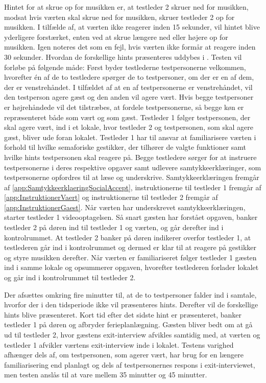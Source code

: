 Hintet for at skrue op for musikken er, at testleder 2 skruer ned for musikken, modsat hvis værten skal skrue ned for musikken, skruer testleder 2 op for musikken. I tilfælde af, at værten ikke reagerer inden 15 sekunder, vil hintet blive yderligere forstærket, enten ved at skrue længere ned eller højere op for musikken. Igen noteres det som en fejl, hvis værten ikke formår at reagere inden 30 sekunder. Hvordan de forskellige hints præsenteres uddybes i .\blankline
% 
Testen vil forløbe på følgende måde: Først byder testlederne testpersonerne velkommen, hvorefter én af de to testledere spørger de to testpersoner, om der er en af dem, der er venstrehåndet. I tilfældet af at en af testpersonerne er venstrehåndet, vil den testperson agere gæst og den anden vil agere vært. Hvis begge testpersoner er højrehåndede vil det tilstræbes, at fordele testpersonerne, så begge køn er repræsenteret både som vært og som gæst. Testleder 1 følger testpersonen, der skal agere vært, ind i et lokale, hvor testleder 2 og testpersonen, som skal agere gæst, bliver ude foran lokalet. Testleder 1 har til ansvar at familiarisere værten i forhold til hvilke semaforiske gestikker, der tilhører de valgte funktioner samt hvilke hints testpersonen skal reagere på. Begge testledere sørger for at instruere testpersonerne i deres respektive opgaver samt udlevere samtykkeerklæringer, som testpersonerne opfordres til at læse og underskrive. Samtykkeerklæringen fremgår af \autoref{app:SamtykkeerklaeringSocialAccept}, instruktionerne til testleder 1 fremgår af \autoref{app:InstruktionerVaert} og instruktionerne til testleder 2 fremgår af \autoref{app:InstruktionerGaest}. Når værten har underskrevet samtykkeerklæringen, starter testleder 1 videooptagelsen. Så snart gæsten har forstået opgaven, banker testleder 2 på døren ind til testleder 1 og værten, og går derefter ind i kontrolrummet. At testleder 2 banker på døren indikerer overfor testleder 1, at testlederen går ind i kontrolrummet og dermed er klar til at reagere på gestikker og styre musikken derefter. Når værten er familiariseret følger testleder 1 gæsten ind i samme lokale og opsummerer opgaven, hvorefter testlederen forlader lokalet og går ind i kontrolrummet til testleder 2.
 
Der afsættes omkring fire minutter til, at de to testpersoner falder ind i samtale, hvorfor der i den tidsperiode ikke vil præsenteres hints. Derefter vil de forskellige hints blive præsenteret. Kort tid efter det sidste hint er præsenteret, banker testleder 1 på døren og afbryder ferieplanlægning. Gæsten bliver bedt om at gå ud til testleder 2, hvor gæstens exit-interview afvikles samtidig med, at værten og testleder 1 afvikler værtens exit-interview inde i lokalet.\blankline
%
Testens varighed afhænger dels af, om testpersonen, som agerer vært, har brug for en længere familiarisering end planlagt og dels af testpersonernes respons i exit-interviewet, men testen anslås til at vare mellem 35 minutter og 45 minutter. 
%
